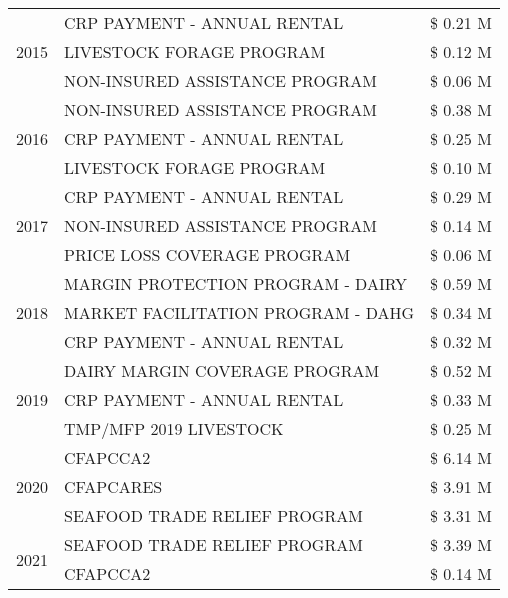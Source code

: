 \begin{tabular}{llr}
\cline{1-3}
\multirow[t]{3}{*}{2015} & CRP PAYMENT - ANNUAL RENTAL & \$ 0.21 M \\
 & LIVESTOCK FORAGE PROGRAM & \$ 0.12 M \\
 & NON-INSURED ASSISTANCE PROGRAM & \$ 0.06 M \\
\cline{1-3}
\multirow[t]{3}{*}{2016} & NON-INSURED ASSISTANCE PROGRAM & \$ 0.38 M \\
 & CRP PAYMENT - ANNUAL RENTAL & \$ 0.25 M \\
 & LIVESTOCK FORAGE PROGRAM & \$ 0.10 M \\
\cline{1-3}
\multirow[t]{3}{*}{2017} & CRP PAYMENT - ANNUAL RENTAL & \$ 0.29 M \\
 & NON-INSURED ASSISTANCE PROGRAM & \$ 0.14 M \\
 & PRICE LOSS COVERAGE PROGRAM & \$ 0.06 M \\
\cline{1-3}
\multirow[t]{3}{*}{2018} & MARGIN PROTECTION PROGRAM - DAIRY & \$ 0.59 M \\
 & MARKET FACILITATION PROGRAM - DAHG & \$ 0.34 M \\
 & CRP PAYMENT - ANNUAL RENTAL & \$ 0.32 M \\
\cline{1-3}
\multirow[t]{3}{*}{2019} & DAIRY MARGIN COVERAGE PROGRAM & \$ 0.52 M \\
 & CRP PAYMENT - ANNUAL RENTAL & \$ 0.33 M \\
 & TMP/MFP 2019 LIVESTOCK & \$ 0.25 M \\
\cline{1-3}
\multirow[t]{3}{*}{2020} & CFAPCCA2 & \$ 6.14 M \\
 & CFAPCARES & \$ 3.91 M \\
 & SEAFOOD TRADE RELIEF PROGRAM & \$ 3.31 M \\
\cline{1-3}
\multirow[t]{2}{*}{2021} & SEAFOOD TRADE RELIEF PROGRAM & \$ 3.39 M \\
 & CFAPCCA2 & \$ 0.14 M \\
\cline{1-3}
\bottomrule
\end{tabular}
